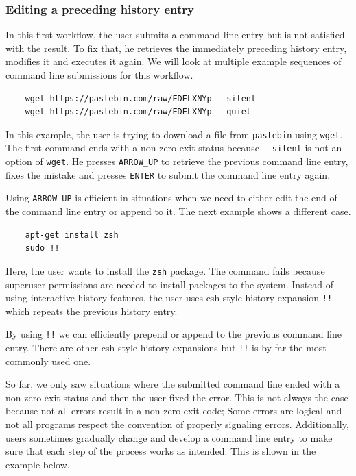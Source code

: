 \documentclass[thesis=M,english]{FITthesis}[2012/10/20]
\begin{document}

\subsubsection*{Editing a preceding history entry}

In this first workflow, the user submits a command line entry but is not satisfied with the result. To fix that, he retrieves the immediately preceding history entry, modifies it and executes it again. We will look at multiple example sequences of command line submissions for this workflow.

\begin{verbatim}
    wget https://pastebin.com/raw/EDELXNYp --silent
    wget https://pastebin.com/raw/EDELXNYp --quiet
\end{verbatim}
In this example, the user is trying to download a file from \verb|pastebin| using \verb|wget|. The first command ends with a non-zero exit status because \verb|--silent| is not an option of \verb|wget|. He presses \verb|ARROW_UP| to retrieve the previous command line entry, fixes the mistake and presses \verb|ENTER| to submit the command line entry again. 

Using \verb|ARROW_UP| is efficient in situations when we need to either edit the end of the command line entry or append to it. %
The next example shows a different case.

\begin{verbatim}
    apt-get install zsh
    sudo !!
\end{verbatim}

Here, the user wants to install the \verb|zsh| package. The command fails because superuser permissions are needed to install packages to the system. Instead of using interactive history features, the user uses csh-style history expansion \verb|!!| which repeats the previous history entry. 

By using \verb|!!| we can efficiently prepend or append to the previous command line entry. There are other csh-style history expansions but \verb|!!| is by far the most commonly used one. 

So far, we only saw situations where the submitted command line ended with a non-zero exit status and then the user fixed the error. This is not always the case because not all errors result in a non-zero exit code; Some errors are logical and not all programs respect the convention of properly signaling errors. Additionally, users sometimes gradually change and develop a command line entry to make sure that each step of the process works as intended. This is shown in the example below.
\end{document}
